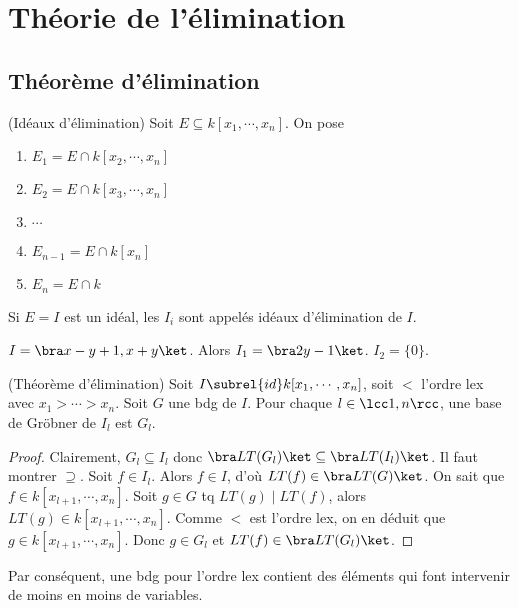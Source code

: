 \chapter{Théorie de l'élimination}
    \section{Théorème d'élimination}
        \begin{defi} (Idéaux d'élimination)
            Soit $E \subseteq k[x_1, \cdots, x_n]$. On pose
            \begin{enumerate}
                \item $E_1 = E \cap k[x_2, \cdots, x_n]$
                \item $E_2 = E \cap k[x_3, \cdots, x_n]$
                \item $\cdots$
                \item $E_{n-1} = E \cap k[x_n]$
                \item $E_n = E \cap k$
            \end{enumerate}
            Si $E = I$ est un idéal, les $I_i$ sont appelés idéaux d'élimination de $I$.
        \end{defi}
        \begin{expl}
            $I = \bra x-y+1, x+y \ket$. Alors $I_1 = \bra 2y - 1 \ket$. $I_2 = \{0\}$.
        \end{expl}
        \begin{theo} (Théorème d'élimination)
            Soit $I \subrel{id} k[x_1, \cdots, x_n]$, soit $<$ l'ordre lex avec $x_1 > \cdots > x_n$. Soit $G$ une bdg de $I$. Pour chaque $l \in \lcc 1,n \rcc$, une base de Gröbner de $I_l$ est $G_l$.
        \end{theo}
        \begin{proof}
            Clairement, $G_l \subseteq I_l$ donc $\bra LT(G_l) \ket \subseteq \bra LT(I_l) \ket$. Il faut montrer $\supseteq$. Soit $f \in I_l$. Alors $f \in I$, d'où $LT(f) \in \bra LT(G) \ket$. On sait que $f \in k[x_{l+1}, \cdots, x_n]$. Soit $g \in G$ tq $LT(g) \mid LT(f)$, alors $LT(g) \in k[x_{l+1}, \cdots, x_n]$. Comme $<$ est l'ordre lex, on en déduit que $g \in k[x_{l+1}, \cdots, x_n]$. Donc $g \in G_l$ et $LT(f) \in \bra LT(G_l) \ket$.
        \end{proof}
        Par conséquent, une bdg pour l'ordre lex contient des éléments qui font intervenir de moins en moins de variables.

